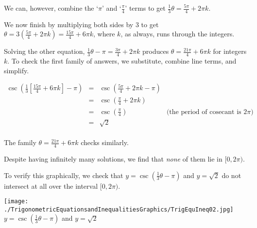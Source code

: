 \documentclass{ximera}
\begin{document}
\begin{example}
\begin{enumerate}
\smallskip

We can, however, combine the `$\pi$' and `$\frac{\pi}{4}$' terms to get $\frac{1}{3} \theta = \frac{5\pi}{4} + 2\pi k$.

\smallskip

We now finish by multiplying both sides by $3$ to get  $\theta  = 3 \left( \frac{5\pi}{4} + 2\pi k \right) = \frac{15 \pi}{4} + 6\pi k$, where $k$, as always, runs through the integers.

\smallskip

Solving the other equation, $\frac{1}{3} \theta-\pi = \frac{3\pi}{4} + 2\pi k$ produces $\theta = \frac{21\pi}{4} + 6 \pi k$ for integers $k$. To check the first family of answers, we substitute, combine line terms, and simplify.

\[ \begin{array}{rclr}

\csc\left(\frac{1}{3} \left[ \frac{15\pi}{4} + 6 \pi  k \right] - \pi   \right)  &  = &  \csc\left(\frac{5\pi}{4} + 2\pi k - \pi \right) & \\ [3pt]
																												& =  &   \csc\left(\frac{\pi}{4} + 2\pi k\right) &  \\ [3pt]
																												& =  & \csc\left(\frac{\pi}{4}\right) & \text{(the period of cosecant is $2\pi$)} \\
																												& = & \sqrt{2} & \\
\end{array}\] 



The family $\theta = \frac{21\pi}{4} + 6 \pi  k$ checks similarly. 

\smallskip

 Despite having infinitely many solutions, we find that \textit{none} of them lie in $[0,2\pi)$. 
 
 \smallskip
 
To verify this graphically, we check that $y = \csc\left(\frac{1}{3} \theta -\pi\right)$ and $y =\sqrt{2}$ do not intersect at all over the interval $[0,2\pi)$.


\begin{center}

 \texttt{[image: ./TrigonometricEquationsandInequalitiesGraphics/TrigEquIneq02.jpg]} \\


{\boldmath  $y = \csc\left(\frac{1}{3} \theta -\pi\right)$} and $y =\sqrt{2}$ \\
 



\end{center}
\end{enumerate}
\end{example}
\end{document}
